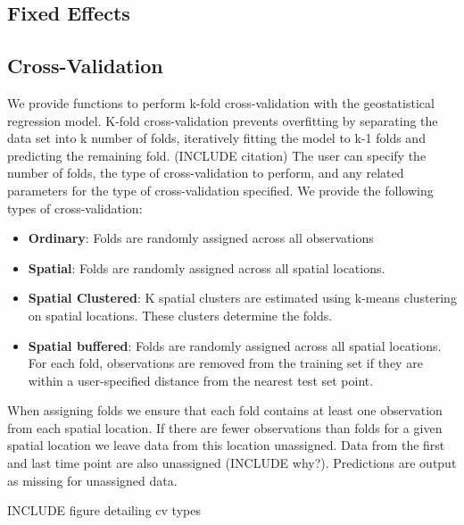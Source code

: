 \subsection*{Fixed Effects}


\subsection*{Cross-Validation}

We provide functions to perform k-fold cross-validation with the geostatistical regression model.
K-fold cross-validation prevents overfitting by separating the data set into k number of folds, iteratively fitting the model to k-1 folds and predicting the remaining fold. (INCLUDE citation)
The user can specify the number of folds, the type of cross-validation to perform, and any related parameters for the type of cross-validation specified.
We provide the following types of cross-validation:

\begin{itemize}
  \item \textbf{Ordinary}: Folds are randomly assigned across all observations
  \item \textbf{Spatial}: Folds are randomly assigned across all spatial locations. 
  \item \textbf{Spatial Clustered}: K spatial clusters are estimated using k-means clustering on spatial locations. These clusters determine the folds. 
  \item \textbf{Spatial buffered}: Folds are randomly assigned across all spatial locations. For each fold, observations are removed from the training set if they are within a user-specified distance from the nearest test set point. 
\end{itemize}

When assigning folds we ensure that each fold contains at least one observation from each spatial location.
If there are fewer observations than folds for a given spatial location we leave data from this location unassigned. 
Data from the first and last time point are also unassigned (INCLUDE why?).
Predictions are output as missing for unassigned data.

INCLUDE figure detailing cv types




























